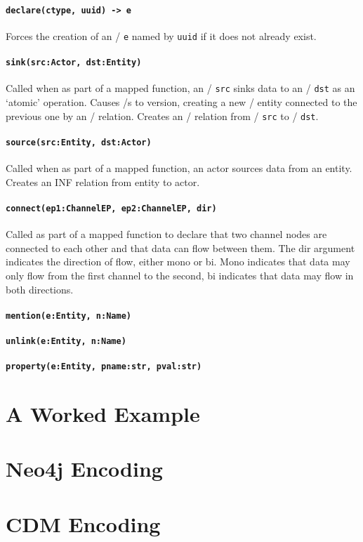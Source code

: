 \documentclass[12pt,twoside,a4paper]{article}
\newcommand{\field}[1]{\texttt{#1}}
\newcommand{\para}[1]{\paragraph{#1\\}}
\begin{document}
\para{\texttt{declare(ctype, uuid) -> e}}
\label{sec:map:verbs:declare}
Forces the creation of an \Entity/ \field{e} named by \field{uuid} if it does not already exist.

\para{\texttt{sink(src:Actor, dst:Entity)}}
\label{sec:map:verbs:sink}
Called when as part of a mapped function, an \Actor/ \field{src} sinks data to an \Entity/ \field{dst} as an ‘atomic’ operation.
Causes \Store/s to version, creating a new \Store/ entity connected to the previous one by an \INF/ relation.
Creates an \INF/ relation from \Actor/ \field{src} to \Entity/ \field{dst}. 

\para{\texttt{source(src:Entity, dst:Actor)}}
\label{sec:map:verbs:source}
Called when as part of a mapped function, an actor sources data from an entity.
Creates an INF relation from entity to actor.

\para{\texttt{connect(ep1:ChannelEP, ep2:ChannelEP, dir)}}
\label{sec:map:verbs:connect}
Called as part of a mapped function to declare that two channel nodes are connected to each other and that data can flow between them. The dir argument indicates the direction of flow, either mono or bi. Mono indicates that data may only flow from the first channel to the second, bi indicates that data may flow in both directions. 

\para{\texttt{mention(e:Entity, n:Name)}}
\label{sec:map:verbs:mention}

\para{\texttt{unlink(e:Entity, n:Name)}}
\label{sec:map:verbs:unlink}

\para{\texttt{property(e:Entity, pname:str, pval:str)}}
\label{sec:map:verbs:property}

\appendix

\section{A Worked Example}
\label{app:example}

\section{Neo4j Encoding}
\label{app:enc:neo4j}

\section{CDM Encoding}
\label{app:enc:cdm}
\end{document}
